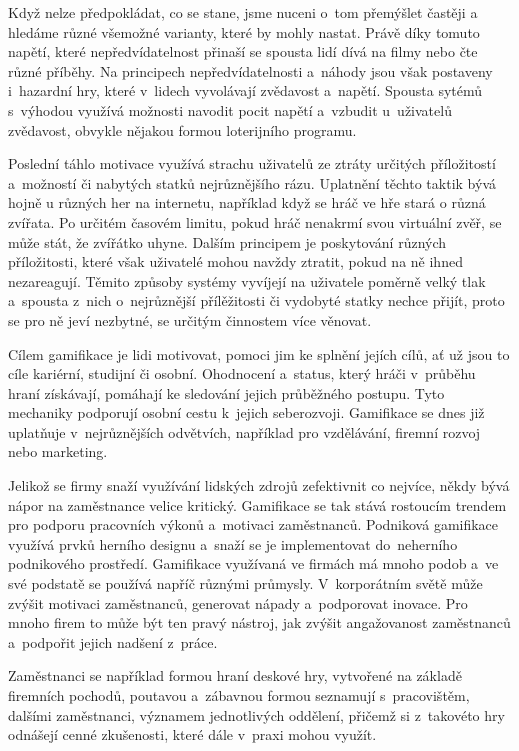 \documentclass[twoside, 12pt]{article}
\begin{document}
Když nelze předpokládat, co se stane, jsme nuceni o~tom přemýšlet častěji a~
hledáme různé všemožné varianty, které by mohly nastat.
Právě díky tomuto napětí, které nepředvídatelnost přinaší se spousta lidí
dívá na filmy nebo čte různé příběhy.
Na principech nepředvídatelnosti a~náhody jsou však postaveny i~hazardní hry,
které v~lidech vyvolávají zvědavost a~napětí.
Spousta sytémů s~výhodou využívá možnosti navodit pocit napětí
a~vzbudit u~uživatelů zvědavost,
obvykle nějakou formou loterijního programu.

Poslední táhlo motivace využívá strachu uživatelů ze ztráty určitých příložitostí
a~možností či nabytých statků nejrůznějšího rázu.
Uplatnění těchto taktik bývá hojně u různých her na internetu,
například když se hráč ve hře stará o různá zvířata.
Po určitém časovém limitu, pokud hráč nenakrmí svou virtuální zvěř,
se může stát, že zvířátko uhyne.
Dalším principem je poskytování různých příložitosti,
které však uživatelé mohou navždy ztratit,
pokud na ně ihned nezareagují.
Těmito způsoby systémy vyvíjejí na uživatele poměrně velký tlak
a~spousta z~nich o~nejrůznější přílěžitosti či vydobyté statky nechce přijít,
proto se pro ně jeví nezbytné, se určitým činnostem více věnovat.


Cílem gamifikace je lidi motivovat,
pomoci jim ke splnění jejích cílů, ať už jsou to cíle kariérní, studijní či osobní.
Ohodnocení a~status, který hráči v~průběhu hraní získávají,
pomáhají ke sledování jejich průběžného postupu.
Tyto mechaniky podporují osobní cestu k~jejich seberozvoji.
Gamifikace se dnes již uplatňuje v~nejrůznějších odvětvích,
například pro vzdělávání, firemní rozvoj nebo marketing.



Jelikož se firmy snaží využívání lidských zdrojů zefektivnit co nejvíce,
někdy bývá nápor na zaměstnance velice kritický.
Gamifikace se tak stává rostoucím trendem pro podporu pracovních výkonů
a~motivaci zaměstnanců.
Podniková gamifikace využívá prvků herního designu a~snaží se
je implementovat do~neherního podnikového prostředí.
Gamifikace využívaná ve firmách
má mnoho podob a~ve své podstatě se používá napříč různými průmysly.
V~korporátním světě může zvýšit motivaci zaměstnanců, generovat nápady a~podporovat inovace.
Pro mnoho firem to může být ten pravý nástroj, jak zvýšit angažovanost zaměstnanců
a~podpořit jejich nadšení z~práce.

\par
Zaměstnanci se například formou hraní deskové hry, vytvořené na základě firemních pochodů,
poutavou a~zábavnou formou seznamují s~pracovištěm, dalšími zaměstnanci,
významem jednotlivých oddělení,
přičemž si z~takovéto hry odnášejí cenné zkušenosti, které dále v~praxi mohou využít.
\end{document}
